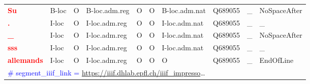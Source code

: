 \begin{table}[!htbp]
{\begin{tabular}{l|ll|lll|l|ll|l}
            \textbf{\textcolor{red}{Su}}        & B-loc                          & O                            & B-loc.adm.reg & O                        & O    & B-loc.adm.nat & Q689055 & \_   & NoSpaceAfter \\
            \textbf{\textcolor{red}{.}}         & I-loc                          & O                            & I-loc.adm.reg & O                        & O    & I-loc.adm.nat & Q689055 & \_   & \_           \\
            \textbf{\textcolor{red}{\_}}        & I-loc                          & O                            & I-loc.adm.reg & O                        & O    & I-loc.adm.nat & Q689055 & \_   & NoSpaceAfter \\
            \textbf{\textcolor{red}{sss}}       & I-loc                          & O                            & I-loc.adm.reg & O                        & O    & I-loc.adm.nat & Q689055 & \_   & \_           \\
            \textbf{\textcolor{red}{allemands}} & I-loc                          & O                            & I-loc.adm.reg & O                        & O    & O             & Q689055 & \_   & EndOfLine    \\

            \multicolumn{10}{l}{\textcolor{blue}{\# segment\_iiif\_link = \url{https://iiif.dhlab.epfl.ch/iiif_impresso}}\dots}                                                                                   \\%


\end{tabular}}
\end{table}
